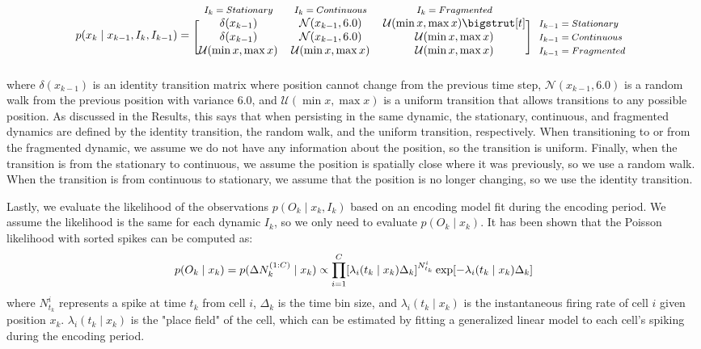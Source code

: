 \documentclass[times, twoside]{zHenriquesLab-StyleBioRxiv}
\begin{document}
\begin{equation*}
  p(x_{k} \mid x_{k-1}, I_{k}, I_{k-1}) = 
  \begin{blockarray}{*{3}{c} l}
    \begin{block}{*{3}{>{$\footnotesize}c<{$}} l}
      $I_{k} = Stationary$ & $I_{k} = Continuous$ & $I_{k} = Fragmented$ \\
    \end{block}
    \begin{block}{[*{3}{c}]>{$\footnotesize}l<{$}}
      \delta(x_{k-1}) & \mathcal{N}(x_{k-1}, 6.0) & \mathcal{U}(\min x, \max x) \bigstrut[t]& $I_{k-1} = Stationary$ \\
      \delta(x_{k-1}) & \mathcal{N}(x_{k-1}, 6.0)  & \mathcal{U}(\min x, \max x) & $I_{k-1} = Continuous$ \\
      \mathcal{U}(\min x, \max x) & \mathcal{U}(\min x, \max x) & \mathcal{U}(\min x, \max x) & $I_{k-1} = Fragmented$ \\
    \end{block}
  \end{blockarray}
\end{equation*}
where $\delta(x_{k-1})$ is an identity transition matrix where position cannot change from the previous time step, $\mathcal{N}(x_{k-1}, 6.0)$ is a random walk from the previous position with variance 6.0, and $\mathcal{U}(\min x, \max x)$ is a uniform transition that allows transitions to any possible position. As discussed in the Results, this says that when persisting in the same dynamic, the stationary, continuous, and fragmented dynamics are defined by the identity transition, the random walk, and the uniform transition, respectively. When transitioning to or from the fragmented dynamic, we assume we do not have any information about the position, so the transition is uniform. Finally, when the transition is from the stationary to continuous, we assume the position is spatially close where it was previously, so we use a random walk. When the transition is from continuous to stationary, we assume that the position is no longer changing, so we use the identity transition.

Lastly, we evaluate the likelihood of the observations $p(O_{k} \mid x_{k}, I_{k})$ based on an encoding model fit during the encoding period. We assume the likelihood is the same for each dynamic $I_k$, so we only need to evaluate $p(O_{k} \mid x_{k})$. It has been shown \cite{ZhangInterpretingNeuronalPopulation1998, BrownStatisticalParadigmNeural1998} that the Poisson likelihood with sorted spikes can be computed as:
$$
p(O_{k} \mid x_{k}) = p(\Delta N_{k}^{(1:C)} \mid x_{k}) \propto
\prod^{C}_{i=1} [\lambda_{i}(t_{k} \mid x_{k})\Delta_{k}]^{N_{t_{k}}^{i}} \\
    \exp[-\lambda_{i}(t_{k} \mid x_{k})\Delta_{k}]
$$
where $N_{t_{k}}^{i}$ represents a spike at time $t_k$ from cell $i$, $\Delta_k$ is the time bin size, and $\lambda_{i}(t_{k} \mid x_{k})$ is the instantaneous firing rate of cell $i$ given position $x_{k}$. $\lambda_{i}(t_{k} \mid x_{k})$ is the "place field" of the cell, which can be estimated by fitting a generalized linear model to each cell's spiking during the encoding period.
\end{document}
